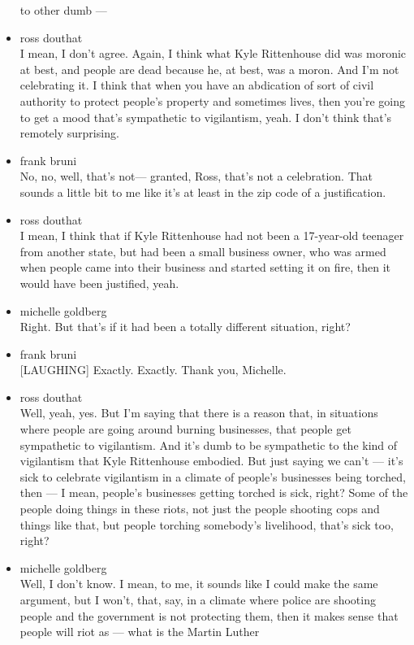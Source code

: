 \begin{itemize}
  to other dumb ---
\item
  ross douthat\\
  I mean, I don't agree. Again, I think what Kyle Rittenhouse did was
  moronic at best, and people are dead because he, at best, was a moron.
  And I'm not celebrating it. I think that when you have an abdication
  of sort of civil authority to protect people's property and sometimes
  lives, then you're going to get a mood that's sympathetic to
  vigilantism, yeah. I don't think that's remotely surprising.
\item
  frank bruni\\
  No, no, well, that's not--- granted, Ross, that's not a celebration.
  That sounds a little bit to me like it's at least in the zip code of a
  justification.
\item
  ross douthat\\
  I mean, I think that if Kyle Rittenhouse had not been a 17-year-old
  teenager from another state, but had been a small business owner, who
  was armed when people came into their business and started setting it
  on fire, then it would have been justified, yeah.
\item
  michelle goldberg\\
  Right. But that's if it had been a totally different situation, right?
\item
  frank bruni\\
  {[}LAUGHING{]} Exactly. Exactly. Thank you, Michelle.
\item
  ross douthat\\
  Well, yeah, yes. But I'm saying that there is a reason that, in
  situations where people are going around burning businesses, that
  people get sympathetic to vigilantism. And it's dumb to be sympathetic
  to the kind of vigilantism that Kyle Rittenhouse embodied. But just
  saying we can't --- it's sick to celebrate vigilantism in a climate of
  people's businesses being torched, then --- I mean, people's
  businesses getting torched is sick, right? Some of the people doing
  things in these riots, not just the people shooting cops and things
  like that, but people torching somebody's livelihood, that's sick too,
  right?
\item
  michelle goldberg\\
  Well, I don't know. I mean, to me, it sounds like I could make the
  same argument, but I won't, that, say, in a climate where police are
  shooting people and the government is not protecting them, then it
  makes sense that people will riot as --- what is the Martin Luther

\end{itemize}
